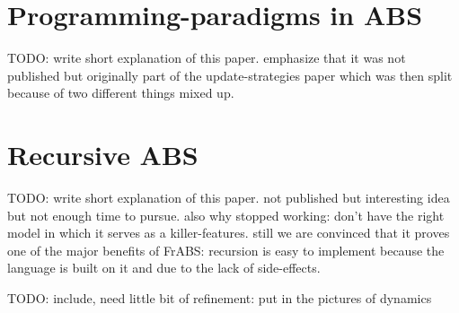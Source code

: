 \begin{appendices}


\chapter{Programming-paradigms in ABS}
TODO: write short explanation of this paper. emphasize that it was not published but originally part of the update-strategies paper which was then split because of two different things mixed up.



\chapter{Recursive ABS}
TODO: write short explanation of this paper. not published but interesting idea but not enough time to pursue. also why stopped working: don't have the right model in which it serves as a killer-features. still we are convinced that it proves one of the major benefits of FrABS: recursion is easy to implement because the language is built on it and due to the lack of side-effects.

TODO: include, need little bit of refinement: put in the pictures of dynamics





\end{appendices}
